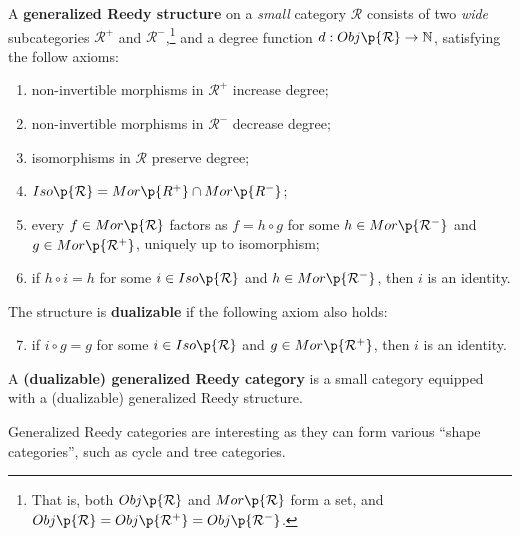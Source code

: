 \begin{definition} A \textbf{generalized Reedy structure}
\cite{berger-moerdijk-2011} on a \emph{small} category $\mathcal{R}$ consists
of two \emph{wide} subcategories $\mathcal{R}^+$ and
$\mathcal{R}^-$,\footnote{That is, both $Obj\p{\mathcal{R}}$ and
$Mor\p{\mathcal{R}}$ form a set, and $Obj\p{\mathcal{R}} = Obj\p{\mathcal{R}^+}
= Obj\p{\mathcal{R}^-}$.} and a degree function $d : Obj\p{\mathcal{R}}
\rightarrow \mathbb{N}$, satisfying the follow axioms:

\begin{enumerate}

\item non-invertible morphisms in $\mathcal{R}^+$ increase degree;

\item non-invertible morphisms in $\mathcal{R}^-$ decrease degree;

\item isomorphisms in $\mathcal{R}$ preserve degree;

\item $Iso\p{\mathcal{R}} = Mor\p{R^+} \cap Mor\p{R^-}$;

\item every $f \in Mor\p{\mathcal{R}}$ factors as $f = h \circ g$ for some $h
\in Mor\p{\mathcal{R}^-}$ and $g \in Mor\p{\mathcal{R}^+}$, uniquely up to
isomorphism;

\item if $h \circ i = h$ for some $i \in Iso\p{\mathcal{R}}$ and $h \in
Mor\p{\mathcal{R}^-}$, then $i$ is an identity.

\end{enumerate}

The structure is \textbf{dualizable} if the following axiom also holds:

\begin{enumerate}
\setcounter{enumi}{6}

\item if $i \circ g = g$ for some $i \in Iso\p{\mathcal{R}}$ and $g \in
Mor\p{\mathcal{R}^+}$, then $i$ is an identity.

\end{enumerate}

A \textbf{(dualizable) generalized Reedy category} is a small category equipped
with a (dualizable) generalized Reedy structure. 

\end{definition}

Generalized Reedy categories are interesting as they can form various ``shape
categories'', such as cycle and tree categories.


